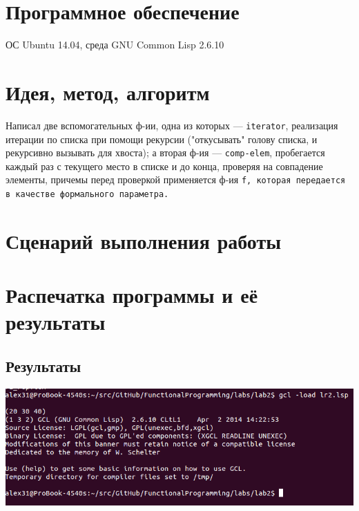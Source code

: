 \documentclass[12pt]{article}
\begin{document}
\section{Программное обеспечение}
ОС Ubuntu 14.04, среда GNU Common Lisp 2.6.10

\section{Идея, метод, алгоритм}
Написал две вспомогательных ф-ии, одна из которых --- {\color{blue}\tt{iterator}}, реализация итерации по списка при помощи рекурсии ("откусывать" голову списка, и рекурсивно вызывать для хвоста); а вторая ф-ия --- {\color{blue}\tt{comp-elem}}, пробегается каждый раз с текущего место в списке и до конца, проверяя на совпадение элементы, причемы перед проверкой применяется ф-ия \tt{f}, которая передается в качестве формального параметра.

\section{Сценарий выполнения работы}
\section{Распечатка программы и её результаты}

\subsection{Результаты}
\includegraphics[scale=0.7]{lr2Screen}

%

\end{document}
